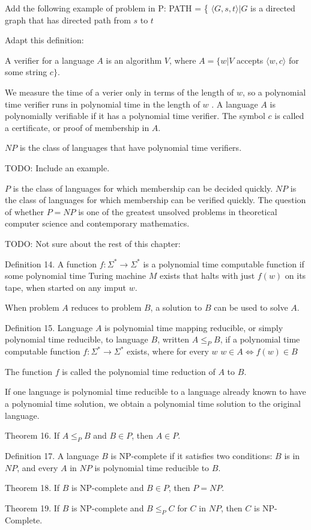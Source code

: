 {\color{red} Add the following example of problem in P: PATH = \{ $\langle G,s,t\rangle|G$ is a directed graph that has directed path from $s$ to $t$ }

{\color{red} Adapt this definition:
\begin{definition}
A verifier for a language $A$ is an algorithm $V$, where $A=\{w|V$ accepts $\langle w, c\rangle$ for some string $c\}$.
\end{definition}
}

{\color{red} We measure the time of a verier only in terms of the length of $w$, so a polynomial time verifier runs in polynomial time in the length of $w$
. A language $A$ is polynomially verifiable if it has a polynomial time verifier. The symbol $c$ is called a certificate, or proof of membership in $A$.}

{\color{red}
\begin{definition}
$NP$ is the class of languages that have polynomial time verifiers.
\end{definition}
}


{\color{red} TODO: Include an example.}

{\color{red} $P$ is the class of languages for which membership can be decided quickly. $NP$ is the class of languages for which membership can be verified quickly. The question of whether $P=NP$ is one of the greatest unsolved problems in theoretical computer science and contemporary mathematics.}


{\color{red} TODO: Not sure about the rest of this chapter:

Definition 14. A function $f:\Sigma^{\ast}\rightarrow\Sigma^{\ast}$ is a polynomial time computable function if some polynomial time Turing machine $M$ exists that halts with just $f(w)$ on its tape, when started on any imput $w$.

When problem $A$ reduces to problem $B$, a solution to $B$ can be used to solve $A$.

Definition 15. Language $A$ is polynomial time mapping reducible, or simply polynomial time reducible, to language $B$, written $A\leq_{P}B$, if a polynomial time computable function $f:\Sigma^{\ast}\rightarrow\Sigma^{\ast}$ exists, where for every $w$ $w\in A\iff f(w)\in B$

The function $f$ is called the polynomial time reduction of $A$ to $B$.

If one language is polynomial time reducible to a language already known to have a polynomial time solution, we obtain a polynomial time solution to the original language.

Theorem 16. If $A\leq_{P}B$ and $B\in P$, then $A\in P$.

Definition 17. A language $B$ is NP-complete if it satisfies two conditions: $B$ is in $NP$, and every $A$ in $NP$ is polynomial time reducible to $B$.

Theorem 18. If $B$ is NP-complete and $B\in P$, then $P=NP$.

Theorem 19. If $B$ is NP-complete and $B\leq_{P}C$ for $C$ in $NP$, then $C$ is NP-Complete.

}

